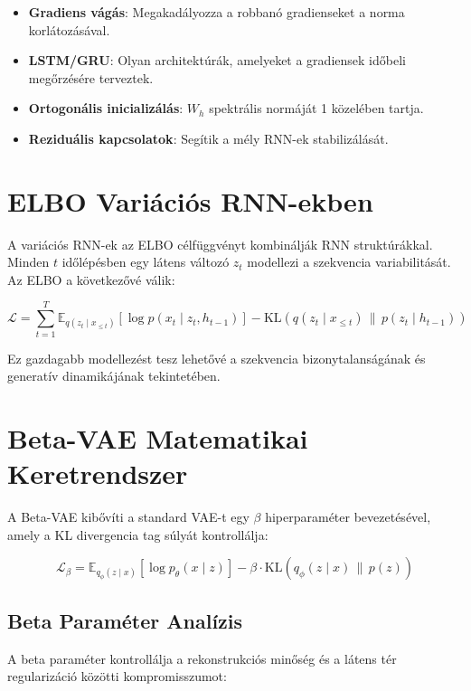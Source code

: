 \begin{itemize}
    \item \textbf{Gradiens vágás}: Megakadályozza a robbanó gradienseket a norma korlátozásával.
    \item \textbf{LSTM/GRU}: Olyan architektúrák, amelyeket a gradiensek időbeli megőrzésére terveztek.
    \item \textbf{Ortogonális inicializálás}: $W_h$ spektrális normáját 1 közelében tartja.
    \item \textbf{Reziduális kapcsolatok}: Segítik a mély RNN-ek stabilizálását.
\end{itemize}

\section{ELBO Variációs RNN-ekben}

A variációs RNN-ek az ELBO célfüggvényt kombinálják RNN struktúrákkal. Minden $t$ időlépésben egy látens változó $z_t$ modellezi a szekvencia variabilitását. Az ELBO a következővé válik:

\begin{equation}
\mathcal{L} = \sum_{t=1}^{T} \mathbb{E}_{q(z_t \mid x_{\leq t})}[\log p(x_t \mid z_t, h_{t-1})] - \text{KL}(q(z_t \mid x_{\leq t}) \, \| \, p(z_t \mid h_{t-1}))
\end{equation}

Ez gazdagabb modellezést tesz lehetővé a szekvencia bizonytalanságának és generatív dinamikájának tekintetében.

\section{Beta-VAE Matematikai Keretrendszer}

A Beta-VAE kibővíti a standard VAE-t egy $\beta$ hiperparaméter bevezetésével, amely a KL divergencia tag súlyát kontrollálja:

\begin{equation}
\mathcal{L}_{\beta} = \mathbb{E}_{q_\phi(z \mid x)}[\log p_\theta(x \mid z)] - \beta \cdot \text{KL}(q_\phi(z \mid x) \, \| \, p(z))
\end{equation}

\subsection{Beta Paraméter Analízis}

A beta paraméter kontrollálja a rekonstrukciós minőség és a látens tér regularizáció közötti kompromisszumot:

